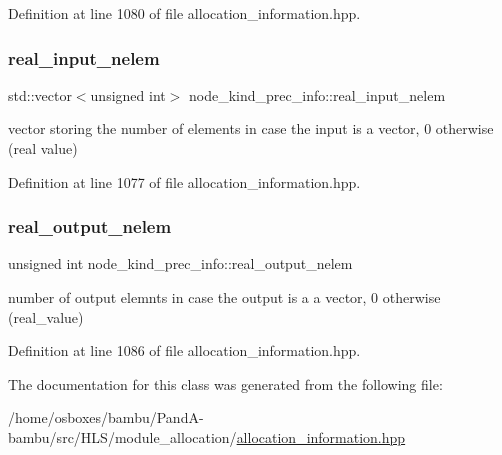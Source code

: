 Definition at line 1080 of file allocation\+\_\+information.\+hpp.

\mbox{\label{structnode__kind__prec__info_ad653f990cb9fc7c9a5f9b19fab554897}} 
\subsubsection{\texorpdfstring{real\+\_\+input\+\_\+nelem}{real\_input\_nelem}}
{\footnotesize\ttfamily std\+::vector$<$unsigned int$>$ node\+\_\+kind\+\_\+prec\+\_\+info\+::real\+\_\+input\+\_\+nelem}



vector storing the number of elements in case the input is a vector, 0 otherwise (real value) 



Definition at line 1077 of file allocation\+\_\+information.\+hpp.

\mbox{\label{structnode__kind__prec__info_aed753065e0a822708af51c0a3b004634}} 
\subsubsection{\texorpdfstring{real\+\_\+output\+\_\+nelem}{real\_output\_nelem}}
{\footnotesize\ttfamily unsigned int node\+\_\+kind\+\_\+prec\+\_\+info\+::real\+\_\+output\+\_\+nelem}



number of output elemnts in case the output is a a vector, 0 otherwise (real\+\_\+value) 



Definition at line 1086 of file allocation\+\_\+information.\+hpp.



The documentation for this class was generated from the following file\+:\begin{DoxyCompactItemize}
\item 
/home/osboxes/bambu/\+Pand\+A-\/bambu/src/\+H\+L\+S/module\+\_\+allocation/\hyperlink{allocation__information_8hpp}{allocation\+\_\+information.\+hpp}\end{DoxyCompactItemize}
